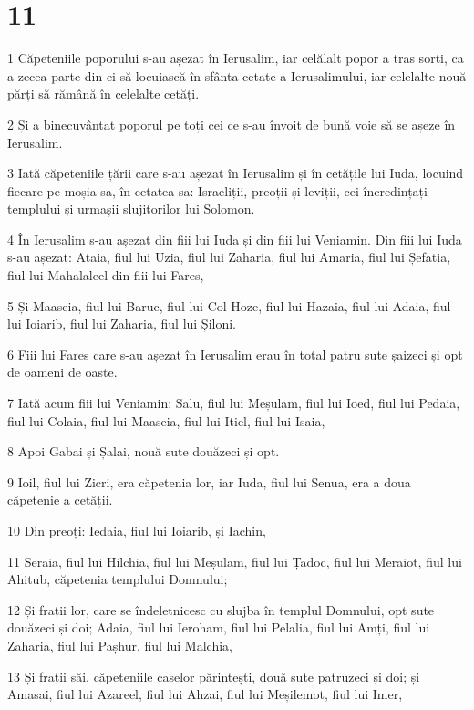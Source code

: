 \chapter{11}

\par 1 Căpeteniile poporului s-au așezat în Ierusalim, iar celălalt popor a tras sorți, ca a zecea parte din ei să locuiască în sfânta cetate a Ierusalimului, iar celelalte nouă părți să rămână în celelalte cetăți.
\par 2 Și a binecuvântat poporul pe toți cei ce s-au învoit de bună voie să se așeze în Ierusalim.
\par 3 Iată căpeteniile țării care s-au așezat în Ierusalim și în cetățile lui Iuda, locuind fiecare pe moșia sa, în cetatea sa: Israeliții, preoții și leviții, cei încredințați templului și urmașii slujitorilor lui Solomon.
\par 4 În Ierusalim s-au așezat din fiii lui Iuda și din fiii lui Veniamin. Din fiii lui Iuda s-au așezat: Ataia, fiul lui Uzia, fiul lui Zaharia, fiul lui Amaria, fiul lui Șefatia, fiul lui Mahalaleel din fiii lui Fares,
\par 5 Și Maaseia, fiul lui Baruc, fiul lui Col-Hoze, fiul lui Hazaia, fiul lui Adaia, fiul lui Ioiarib, fiul lui Zaharia, fiul lui Șiloni.
\par 6 Fiii lui Fares care s-au așezat în Ierusalim erau în total patru sute șaizeci și opt de oameni de oaste.
\par 7 Iată acum fiii lui Veniamin: Salu, fiul lui Meșulam, fiul lui Ioed, fiul lui Pedaia, fiul lui Colaia, fiul lui Maaseia, fiul lui Itiel, fiul lui Isaia,
\par 8 Apoi Gabai și Șalai, nouă sute douăzeci și opt.
\par 9 Ioil, fiul lui Zicri, era căpetenia lor, iar Iuda, fiul lui Senua, era a doua căpetenie a cetății.
\par 10 Din preoți: Iedaia, fiul lui Ioiarib, și Iachin,
\par 11 Seraia, fiul lui Hilchia, fiul lui Meșulam, fiul lui Țadoc, fiul lui Meraiot, fiul lui Ahitub, căpetenia templului Domnului;
\par 12 Și frații lor, care se îndeletnicesc cu slujba în templul Domnului, opt sute douăzeci și doi; Adaia, fiul lui Ieroham, fiul lui Pelalia, fiul lui Amți, fiul lui Zaharia, fiul lui Pașhur, fiul lui Malchia,
\par 13 Și frații săi, căpeteniile caselor părintești, două sute patruzeci și doi; și Amasai, fiul lui Azareel, fiul lui Ahzai, fiul lui Meșilemot, fiul lui Imer,
